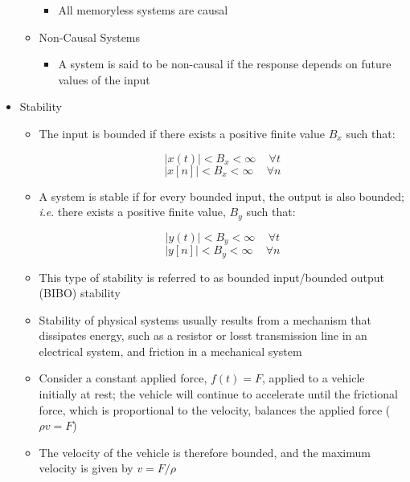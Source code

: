 \begin{itemize}
\begin{itemize}
\begin{itemize}
          \item All memoryless systems are causal

        \end{itemize}

      \item Non-Causal Systems

        \begin{itemize}

          \item A system is said to be non-causal if the response depends on future values of the input

        \end{itemize}

    \end{itemize}

  \item Stability

    \begin{itemize}

      \item The input is bounded if there exists a positive finite value $B_{x}$ such that:

        $$|x(t)|<B_x<\infty\,\quad\forall t$$
        $$|x[n]|<B_x<\infty\,\quad\forall n$$

      \item A system is stable if for every bounded input, the output is also bounded; \textit{i}.\textit{e}. there exists a positive finite value, $B_y$ such that:

        $$|y(t)|<B_y<\infty\,\quad\forall t$$
        $$|y[n]|<B_y<\infty\,\quad\forall n$$

      \item This type of stability is referred to as bounded input/bounded output (BIBO) stability

      \item Stability of physical systems usually results from a mechanism that dissipates energy, such as a resistor or losst transmission line in an electrical system, and friction in a mechanical system

      \item Consider a constant applied force, $f(t)=F$, applied to a vehicle initially at rest; the vehicle will continue to accelerate until the frictional force, which is proportional to the velocity, balances the applied force ($\rho v=F$)

      \item The velocity of the vehicle is therefore bounded, and the maximum velocity is given by $v=F/\rho$


\end{itemize}
\end{itemize}
